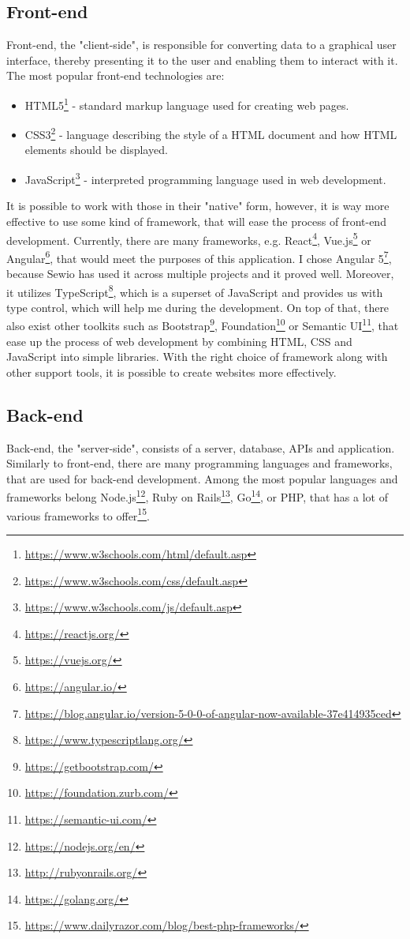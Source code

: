 \subsection{Front-end}
Front-end, the "client-side", is responsible for converting data to a graphical user interface, thereby presenting it to the user and enabling them to interact with it. The most popular front-end technologies are:
\begin{itemize}
\item HTML5\footnote{\url{https://www.w3schools.com/html/default.asp}} - standard markup language used for creating web pages.
\item CSS3\footnote{\url{https://www.w3schools.com/css/default.asp}} - language describing the style of a HTML document and how HTML elements should be displayed.
\item JavaScript\footnote{\url{https://www.w3schools.com/js/default.asp}} - interpreted programming language used in web development.
\end{itemize}

It is possible to work with those in their "native" form, however, it is way more effective to use some kind of framework, that will ease the process of front-end development. Currently, there are many frameworks, e.g. React\footnote{\url{https://reactjs.org/}}, Vue.js\footnote{\url{https://vuejs.org/}} or Angular\footnote{\url{https://angular.io/}}, that would meet the purposes of this application. I chose Angular 5\footnote{\url{https://blog.angular.io/version-5-0-0-of-angular-now-available-37e414935ced}}, because Sewio has used it across multiple projects and it proved well. Moreover, it utilizes TypeScript\footnote{\url{https://www.typescriptlang.org/}}, which is a superset of JavaScript and provides us with type control, which will help me during the development. On top of that, there also exist other toolkits such as Bootstrap\footnote{\url{https://getbootstrap.com/}}, Foundation\footnote{\url{https://foundation.zurb.com/}} or Semantic UI\footnote{\url{https://semantic-ui.com/}}, that ease up the process of web development by combining HTML, CSS and JavaScript into simple libraries. With the right choice of framework along with other support tools, it is possible to create websites more effectively.

\subsection{Back-end}
Back-end, the "server-side", consists of a server, database, APIs and application. Similarly to front-end, there are many programming languages and frameworks, that are used for back-end development. Among the most popular languages and frameworks belong Node.js\footnote{\url{https://nodejs.org/en/}}, Ruby on Rails\footnote{\url{http://rubyonrails.org/}}, Go\footnote{\url{https://golang.org/}}, or PHP, that has a lot of various frameworks to offer\footnote{\url{https://www.dailyrazor.com/blog/best-php-frameworks/}}.

